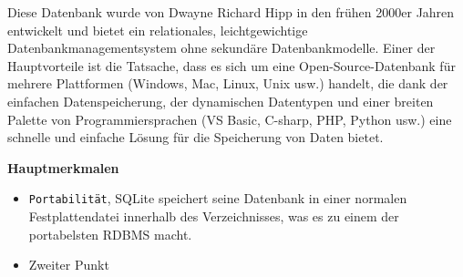 Diese Datenbank wurde von Dwayne Richard Hipp in den frühen 2000er Jahren entwickelt und bietet ein relationales,
leichtgewichtige Datenbankmanagementsystem ohne sekundäre Datenbankmodelle. Einer der Hauptvorteile ist die Tatsache,
dass es sich um eine Open-Source-Datenbank für mehrere Plattformen (Windows, Mac, Linux, Unix usw.) handelt, die dank der einfachen Datenspeicherung,
der dynamischen Datentypen und einer breiten Palette von Programmiersprachen (VS Basic, C-sharp, PHP, Python usw.) eine schnelle und einfache Lösung für die Speicherung von Daten bietet.


\begin{large} \textbf{Hauptmerkmalen} \end{large}
\begin{itemize}
    \item \texttt{Portabilität},
    SQLite speichert seine Datenbank in einer normalen Festplattendatei innerhalb des Verzeichnisses,
    was es zu einem der portabelsten RDBMS macht. 
    \item Zweiter Punkt
\end{itemize}